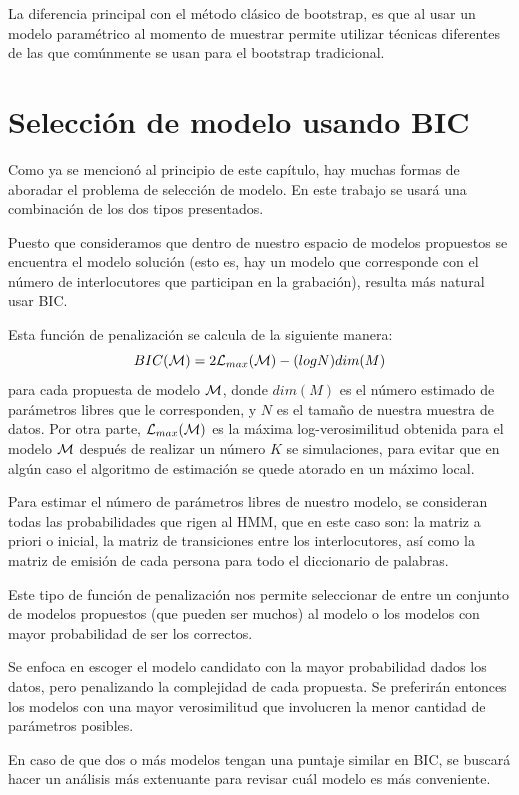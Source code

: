 La diferencia principal con el método clásico de bootstrap, es que al usar un modelo paramétrico al momento de muestrar permite utilizar técnicas diferentes de las que comúnmente se usan para el bootstrap tradicional.

\section{Selección de modelo usando BIC}

Como ya se mencionó al principio de este capítulo, hay muchas formas de aboradar el problema de selección de modelo. En este trabajo se usará una combinación de los dos tipos presentados.

Puesto que consideramos que dentro de nuestro espacio de modelos propuestos se encuentra el modelo solución (esto es, hay un modelo que corresponde con el número de interlocutores que participan en la grabación), resulta más natural usar \ac{BIC}.

Esta función de penalización se calcula de la siguiente manera: 
\begin{equation}
BIC(\mathcal{M}) = 2 \mathcal{L}_{max}(\mathcal{M}) - (log N ) dim(M)
\end{equation}
para cada propuesta de modelo $\mathcal{M}$, donde $dim(M)$ es el número estimado de parámetros libres que le corresponden, y $N$ es el tamaño de nuestra muestra de datos. Por otra parte, $\mathcal{L}_{max}(\mathcal{M})$ es la máxima log-verosimilitud obtenida para el modelo $\mathcal{M}$ después de realizar un número $K$ se simulaciones, para evitar que en algún caso el algoritmo de estimación se quede atorado en un máximo local.

Para estimar el número de parámetros libres de nuestro modelo, se consideran todas las probabilidades que rigen al \ac{HMM}, que en este caso son: la matriz a priori o inicial, la matriz de transiciones entre los interlocutores, así como la matriz de emisión de cada persona para todo el diccionario de palabras.

Este tipo de función de penalización nos permite seleccionar de entre un conjunto de modelos propuestos (que pueden ser muchos) al modelo o los modelos con mayor probabilidad de ser los correctos. 

Se enfoca en escoger el modelo candidato con la mayor probabilidad dados los datos, pero penalizando la complejidad de cada propuesta. Se preferirán entonces los modelos con una mayor verosimilitud que involucren la menor cantidad de parámetros posibles. 

En caso de que dos o más modelos tengan una puntaje similar en \ac{BIC}, se buscará hacer un análisis más extenuante para revisar cuál modelo es más conveniente.

